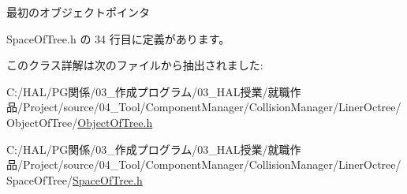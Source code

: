 最初のオブジェクトポインタ 



 Space\+Of\+Tree.\+h の 34 行目に定義があります。



このクラス詳解は次のファイルから抽出されました\+:\begin{DoxyCompactItemize}
\item 
C\+:/\+H\+A\+L/\+P\+G関係/03\+\_\+作成プログラム/03\+\_\+\+H\+A\+L授業/就職作品/\+Project/source/04\+\_\+\+Tool/\+Component\+Manager/\+Collision\+Manager/\+Liner\+Octree/\+Object\+Of\+Tree/\mbox{\hyperlink{_object_of_tree_8h}{Object\+Of\+Tree.\+h}}\item 
C\+:/\+H\+A\+L/\+P\+G関係/03\+\_\+作成プログラム/03\+\_\+\+H\+A\+L授業/就職作品/\+Project/source/04\+\_\+\+Tool/\+Component\+Manager/\+Collision\+Manager/\+Liner\+Octree/\+Space\+Of\+Tree/\mbox{\hyperlink{_space_of_tree_8h}{Space\+Of\+Tree.\+h}}\end{DoxyCompactItemize}
